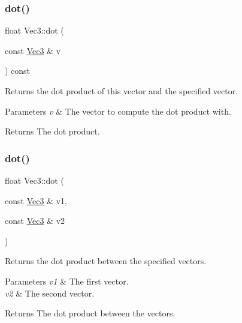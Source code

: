 \subsubsection{\texorpdfstring{dot()}{dot()}\hspace{0.1cm}{\footnotesize\ttfamily [3/4]}}
{\footnotesize\ttfamily float Vec3\+::dot (\begin{DoxyParamCaption}\item[{const \hyperlink{classVec3}{Vec3} \&}]{v }\end{DoxyParamCaption}) const}

Returns the dot product of this vector and the specified vector.


\begin{DoxyParams}{Parameters}
{\em v} & The vector to compute the dot product with.\\
\hline
\end{DoxyParams}
\begin{DoxyReturn}{Returns}
The dot product. 
\end{DoxyReturn}
\mbox{\label{classVec3_a6c8d2f9c5d8f05cb7c36bb19202464b0}} 
\subsubsection{\texorpdfstring{dot()}{dot()}\hspace{0.1cm}{\footnotesize\ttfamily [4/4]}}
{\footnotesize\ttfamily float Vec3\+::dot (\begin{DoxyParamCaption}\item[{const \hyperlink{classVec3}{Vec3} \&}]{v1,  }\item[{const \hyperlink{classVec3}{Vec3} \&}]{v2 }\end{DoxyParamCaption})\hspace{0.3cm}{\ttfamily [static]}}

Returns the dot product between the specified vectors.


\begin{DoxyParams}{Parameters}
{\em v1} & The first vector. \\
\hline
{\em v2} & The second vector.\\
\hline
\end{DoxyParams}
\begin{DoxyReturn}{Returns}
The dot product between the vectors. 
\end{DoxyReturn}
\mbox{\label{classVec3_a69e69924eba8d6421ef87aaacfd3e6c2}} 
